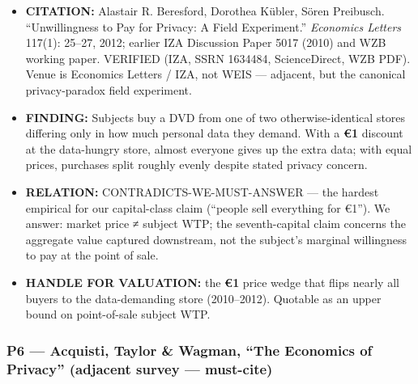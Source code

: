 \documentclass[
  11pt,
]{article}
\providecommand{\tightlist}{%
  \setlength{\itemsep}{0pt}\setlength{\parskip}{0pt}}
\begin{document}
\begin{itemize}
\tightlist
\item
  \textbf{CITATION:} Alastair R. Beresford, Dorothea Kübler, Sören
  Preibusch. ``Unwillingness to Pay for Privacy: A Field Experiment.''
  \emph{Economics Letters} 117(1): 25--27, 2012; earlier IZA Discussion
  Paper 5017 (2010) and WZB working paper. VERIFIED (IZA, SSRN 1634484,
  ScienceDirect, WZB PDF). Venue is Economics Letters / IZA, not WEIS
  --- adjacent, but the canonical privacy-paradox field experiment.
\item
  \textbf{FINDING:} Subjects buy a DVD from one of two
  otherwise-identical stores differing only in how much personal data
  they demand. With a \textbf{€1} discount at the data-hungry store,
  almost everyone gives up the extra data; with equal prices, purchases
  split roughly evenly despite stated privacy concern.
\item
  \textbf{RELATION:} CONTRADICTS-WE-MUST-ANSWER --- the hardest
  empirical for our capital-class claim (``people sell everything for
  €1''). We answer: market price ≠ subject WTP; the seventh-capital
  claim concerns the aggregate value captured downstream, not the
  subject's marginal willingness to pay at the point of sale.
\item
  \textbf{HANDLE FOR VALUATION:} the \textbf{€1} price wedge that flips
  nearly all buyers to the data-demanding store (2010--2012). Quotable
  as an upper bound on point-of-sale subject WTP.
\end{itemize}

\subsubsection{P6 --- Acquisti, Taylor \& Wagman, ``The Economics of
Privacy'' (adjacent survey ---
must-cite)}\label{p6-acquisti-taylor-wagman-the-economics-of-privacy-adjacent-survey-must-cite}
\end{document}
